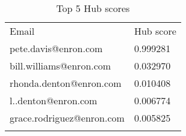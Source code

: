 \documentclass{tufte-handout}
\begin{document}
\begin{longtable}[c]{@{}ll@{}}
\toprule\addlinespace
\begin{minipage}[b]{0.37\columnwidth}\raggedright
Email
\end{minipage} & \begin{minipage}[b]{0.16\columnwidth}\raggedright
Hub score
\end{minipage}
\\\addlinespace
\midrule\endhead
\begin{minipage}[t]{0.37\columnwidth}\raggedright
pete.davis@enron.com
\end{minipage} & \begin{minipage}[t]{0.16\columnwidth}\raggedright
0.999281
\end{minipage}
\\\addlinespace
\begin{minipage}[t]{0.37\columnwidth}\raggedright
bill.williams@enron.com
\end{minipage} & \begin{minipage}[t]{0.16\columnwidth}\raggedright
0.032970
\end{minipage}
\\\addlinespace
\begin{minipage}[t]{0.37\columnwidth}\raggedright
rhonda.denton@enron.com
\end{minipage} & \begin{minipage}[t]{0.16\columnwidth}\raggedright
0.010408
\end{minipage}
\\\addlinespace
\begin{minipage}[t]{0.37\columnwidth}\raggedright
l..denton@enron.com
\end{minipage} & \begin{minipage}[t]{0.16\columnwidth}\raggedright
0.006774
\end{minipage}
\\\addlinespace
\begin{minipage}[t]{0.37\columnwidth}\raggedright
grace.rodriguez@enron.com
\end{minipage} & \begin{minipage}[t]{0.16\columnwidth}\raggedright
0.005825
\end{minipage}
\\\addlinespace
\bottomrule
\addlinespace
\caption{Top 5 Hub scores}
\end{longtable}
\end{document}
